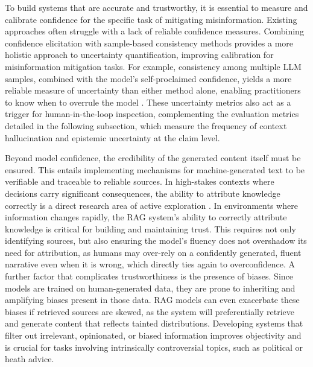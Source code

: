 \documentclass[11pt]{article}
\begin{document}
To build systems that are accurate and trustworthy, it is essential to measure and calibrate confidence for the specific task of mitigating misinformation. Existing approaches often struggle with a lack of reliable confidence measures. Combining confidence elicitation with sample-based consistency methods provides a more holistic approach to uncertainty quantification, improving calibration for misinformation mitigation tasks. For example, consistency among multiple LLM samples, combined with the model's self-proclaimed confidence, yields a more reliable measure of uncertainty than either method alone, enabling practitioners to know when to overrule the model \cite{ref162}. These uncertainty metrics also act as a trigger for human-in-the-loop inspection, complementing the evaluation metrics detailed in the following subsection, which measure the frequency of context hallucination and epistemic uncertainty at the claim level.

Beyond model confidence, the credibility of the generated content itself must be ensured. This entails implementing mechanisms for machine-generated text to be verifiable and traceable to reliable sources. In high-stakes contexts where decisions carry significant consequences, the ability to attribute knowledge correctly is a direct research area of active exploration \cite{ref163}. In environments where information changes rapidly, the RAG system's ability to correctly attribute knowledge is critical for building and maintaining trust. This requires not only identifying sources, but also ensuring the model's fluency does not overshadow its need for attribution, as humans may over-rely on a confidently generated, fluent narrative even when it is wrong, which directly ties again to overconfidence. A further factor that complicates trustworthiness is the presence of biases. Since models are trained on human-generated data, they are prone to inheriting and amplifying biases present in those data. RAG models can even exacerbate these biases if retrieved sources are skewed, as the system will preferentially retrieve and generate content that reflects tainted distributions. Developing systems that filter out irrelevant, opinionated, or biased information improves objectivity and is crucial for tasks involving intrinsically controversial topics, such as political or heath advice.
\end{document}
